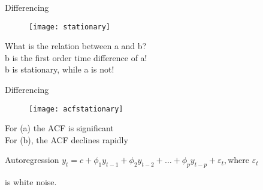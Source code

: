 \documentclass{beamer}
\begin{document}
\begin{frame}{Differencing}
\begin{figure}
	\centering
	\texttt{[image: stationary]}
	\vspace{-15pt}
	\label{fig:timeseries-cv}
\end{figure}
What is the relation between a and b? \\
b is the first order time difference of a! \\
b is stationary, while a is not!
\end{frame}

\begin{frame}{Differencing}
\begin{figure}
	\centering
	\texttt{[image: acfstationary]}
	\vspace{-15pt}
	\label{fig:timeseries-cv}
\end{figure}
For (a) the ACF is significant \\
For (b), the ACF declines rapidly
\end{frame}

\begin{frame}{Autoregression}
$y_{t} = c + \phi_{1}y_{t-1} + \phi_{2}y_{t-2} + \dots + \phi_{p}y_{t-p} + \varepsilon_{t},$where $\varepsilon_{t}$ 

is white noise.
\end{frame}
\end{document}
